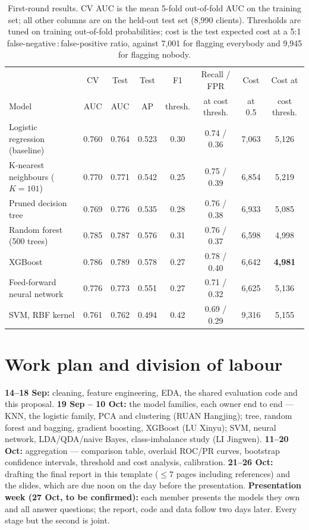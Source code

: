 \documentclass{article}
\begin{document}
\begin{table}[t]
  \caption{First-round results. CV AUC is the mean 5-fold out-of-fold AUC on the
    training set; all other columns are on the held-out test set (8,990 clients).
    Thresholds are tuned on training out-of-fold probabilities; cost is the test
    expected cost at a 5:1 false-negative\,:\,false-positive ratio, against 7,001
    for flagging everybody and 9,945 for flagging nobody.}
  \label{tab:results}
  \centering
  \small
  \setlength{\tabcolsep}{5pt}
  \begin{tabular}{@{}lccccccc@{}}
    \toprule
    & CV & Test & Test & F1 & Recall / FPR & Cost & Cost at \\
    Model & AUC & AUC & AP & thresh. & at cost thresh. & at 0.5 & cost thresh. \\
    \midrule
    Logistic regression (baseline) & 0.760 & 0.764 & 0.523 & 0.30 & 0.74 / 0.36 & 7,063 & 5,126 \\
    K-nearest neighbours ($K = 101$) & 0.770 & 0.771 & 0.542 & 0.25 & 0.75 / 0.39 & 6,854 & 5,219 \\
    Pruned decision tree & 0.769 & 0.776 & 0.535 & 0.28 & 0.76 / 0.38 & 6,933 & 5,085 \\
    Random forest (500 trees) & 0.785 & 0.787 & 0.576 & 0.31 & 0.76 / 0.37 & 6,598 & 4,998 \\
    XGBoost & 0.786 & 0.789 & 0.578 & 0.27 & 0.78 / 0.40 & 6,642 & \textbf{4,981} \\
    Feed-forward neural network & 0.776 & 0.773 & 0.551 & 0.27 & 0.71 / 0.32 & 6,625 & 5,136 \\
    SVM, RBF kernel & 0.761 & 0.762 & 0.494 & 0.42 & 0.69 / 0.29 & 9,316 & 5,155 \\
    \bottomrule
  \end{tabular}
\end{table}

\section{Work plan and division of labour}

\textbf{14--18 Sep:} cleaning, feature engineering, EDA, the shared evaluation
code and this proposal. \textbf{19 Sep -- 10 Oct:} the model families, each owner
end to end --- KNN, the logistic family, PCA and clustering (RUAN Hangjing);
tree, random forest and bagging, gradient boosting, XGBoost (LU Xinyu); SVM,
neural network, LDA/QDA/naive Bayes, class-imbalance study (LI Jingwen).
\textbf{11--20 Oct:} aggregation --- comparison table, overlaid ROC/PR curves,
bootstrap confidence intervals, threshold and cost analysis, calibration.
\textbf{21--26 Oct:} drafting the final report in this template ($\le 7$ pages
including references) and the slides, which are due noon on the day before the
presentation. \textbf{Presentation week (27 Oct, to be confirmed):} each member
presents the models they own and all answer questions; the report, code and data
follow two days later. Every stage but the second is joint.
\end{document}
